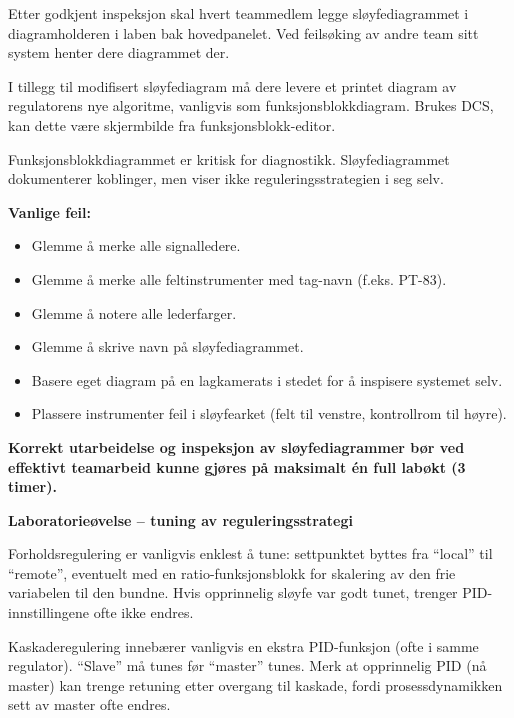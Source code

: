 Etter godkjent inspeksjon skal hvert teammedlem legge sløyfediagrammet i diagramholderen i laben bak hovedpanelet. Ved feilsøking av andre team sitt system henter dere diagrammet der.

\vskip 10pt

I tillegg til modifisert sløyfediagram må dere levere et printet diagram av regulatorens nye algoritme, vanligvis som funksjonsblokkdiagram. Brukes DCS, kan dette være skjermbilde fra funksjonsblokk-editor.

Funksjonsblokkdiagrammet er kritisk for diagnostikk. Sløyfediagrammet dokumenterer koblinger, men viser ikke reguleringsstrategien i seg selv.

\vskip 10pt

{\bf Vanlige feil:}

\begin{itemize}
\item{} Glemme å merke alle signalledere.
\item{} Glemme å merke alle feltinstrumenter med tag-navn (f.eks. PT-83).
\item{} Glemme å notere alle lederfarger.
\item{} Glemme å skrive navn på sløyfediagrammet.
\item{} Basere eget diagram på en lagkamerats i stedet for å inspisere systemet selv.
\item{} Plassere instrumenter feil i sløyfearket (felt til venstre, kontrollrom til høyre).
\end{itemize}

\vskip 10pt

{\bf Korrekt utarbeidelse og inspeksjon av sløyfediagrammer bør ved effektivt teamarbeid kunne gjøres på maksimalt én full labøkt (3 timer).}





\vfil \eject

\noindent
{\bf Laboratorieøvelse -- tuning av reguleringsstrategi}

\vskip 5pt

Forholdsregulering er vanligvis enklest å tune: settpunktet byttes fra ``local'' til ``remote'', eventuelt med en ratio-funksjonsblokk for skalering av den frie variabelen til den bundne. Hvis opprinnelig sløyfe var godt tunet, trenger PID-innstillingene ofte ikke endres.

\vskip 10pt

Kaskaderegulering innebærer vanligvis en ekstra PID-funksjon (ofte i samme regulator). ``Slave'' må tunes før ``master'' tunes. Merk at opprinnelig PID (nå master) kan trenge retuning etter overgang til kaskade, fordi prosessdynamikken sett av master ofte endres.

